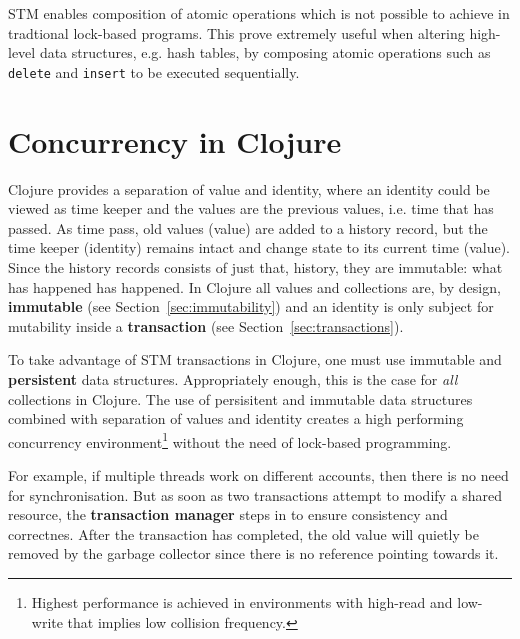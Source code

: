 \documentclass[a4paper,12pt]{kth-mag}
\begin{document}
STM enables composition of atomic operations\cite{cmt} which is not possible to achieve in tradtional lock-based programs. This prove extremely useful when altering high-level data structures, e.g. hash tables, by composing atomic operations such as \texttt{delete} and \texttt{insert} to be executed sequentially. 

\section{Concurrency in Clojure}
Clojure provides a separation of value and identity, where an identity could be viewed as time keeper and the values are the previous values, i.e. time that has passed. As time pass, old values (value) are added to a history record, but the time keeper (identity) remains intact and change state to its current time (value). Since the history records consists of just that, history, they are immutable: what has happened has happened. In Clojure all values and collections are, by design, \textbf{immutable} (see Section~\ref{sec:immutability}) and an identity is only subject for mutability inside a \textbf{transaction} (see Section~\ref{sec:transactions}).

To take advantage of STM transactions in Clojure, one must use immutable and \textbf{persistent} data structures\cite{sub11}. Appropriately enough, this is the case for \textit{all} collections in Clojure. The use of persisitent and immutable data structures combined with separation of values and identity creates a high performing concurrency environment\footnote{Highest performance is achieved in environments with high-read and low-write that implies low collision frequency.} without the need of lock-based programming.

For example, if multiple threads work on different accounts, then there is no need for synchronisation. But as soon as two transactions attempt to modify a shared resource, the \textbf{transaction manager} steps in to ensure consistency and correctnes. After the transaction has completed, the old value will quietly be removed by the garbage collector since there is no reference pointing towards it.
\end{document}
